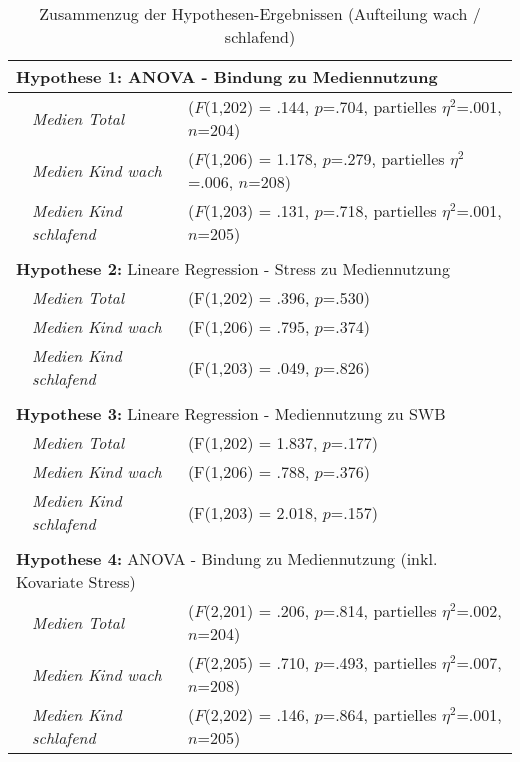 \begin{table}[ht]
\centering
\captionsetup{margin=20pt,skip=5pt}
\caption{Zusammenzug der Hypothesen-Ergebnissen (Aufteilung wach / schlafend)}
\label{table:AppZusammenzugResultate}
\begin{tabular}{l l  l }

  \multicolumn{3}{l}{\textbf{Hypothese 1:} ANOVA - Bindung zu Mediennutzung}\\
  \hline
  & \textit{Medien Total} & ($F$(1,202) = .144, $p$=.704, partielles $\eta^2$=.001, $n$=204)\\
  & \textit{Medien Kind wach} & ($F$(1,206) = 1.178, $p$=.279, partielles $\eta^2$=.006, $n$=208)\\
  & \textit{Medien Kind schlafend} & ($F$(1,203) = .131, $p$=.718, partielles $\eta^2$=.001, $n$=205)\\
  &&\\
  
  \multicolumn{3}{l}{\textbf{Hypothese 2:} Lineare Regression - Stress zu Mediennutzung}\\
  \hline
  & \textit{Medien Total} & (F(1,202) = .396, $p$=.530)\\
  & \textit{Medien Kind wach} & (F(1,206) = .795, $p$=.374)\\
  & \textit{Medien Kind schlafend} & (F(1,203) = .049, $p$=.826)\\
    &&\\
  
  \multicolumn{3}{l}{\textbf{Hypothese 3:} Lineare Regression - Mediennutzung zu SWB}\\
  \hline
  &\textit{Medien Total} & (F(1,202) = 1.837, $p$=.177)\\
  & \textit{Medien Kind wach} & (F(1,206) = .788, $p$=.376)\\
  & \textit{Medien Kind schlafend} & (F(1,203) = 2.018, $p$=.157)\\
  &&\\

  \multicolumn{3}{l}{\textbf{Hypothese 4:} ANOVA - Bindung zu Mediennutzung (inkl. Kovariate Stress)}\\
  \hline
  & \textit{Medien Total} & ($F$(2,201) = .206, $p$=.814, partielles $\eta^2$=.002, $n$=204)\\
  & \textit{Medien Kind wach} & ($F$(2,205) = .710, $p$=.493, partielles $\eta^2$=.007, $n$=208)\\
  & \textit{Medien Kind schlafend} & ($F$(2,202) = .146, $p$=.864, partielles $\eta^2$=.001, $n$=205)\\
\end{tabular}
\end{table}